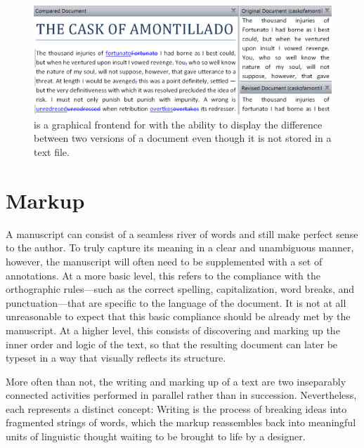 \documentclass[
  a5paper,10pt,           %
  dvipsnames              %
]{book}
\begin{document}
\begin{figure}
  \includegraphics[width=\textwidth]{examples/01/tortoise-svn.png}
  \caption{ is a graphical frontend for
     with the ability to display the difference between two versions
    of a  document even though it is not stored in a text
    file.}
\end{figure}


\chapter{Markup}
A manuscript can consist of a seamless river of words and still make perfect
sense to the author. To truly capture its meaning in a clear and unambiguous
manner, however, the manuscript will often need to be supplemented with a set of
annotations. At a more basic level, this refers to the compliance with the
orthographic rules---such as the correct spelling, capitalization, word breaks,
and punctuation---that are specific to the language of the document.  It is not
at all unreasonable to expect that this basic compliance should be already met
by the manuscript. At a higher level, this consists of discovering and marking
up the inner order and logic of the text, so that the resulting document can
later be typeset in a way that visually reflects its structure.

More often than not, the writing and marking up of a text are two inseparably
connected activities performed in parallel rather than in succession.
Nevertheless, each represents a distinct concept: Writing is the process of
breaking ideas into fragmented strings of words, which the markup reassembles
back into meaningful units of linguistic thought waiting to be brought to life
by a designer.
\end{document}
